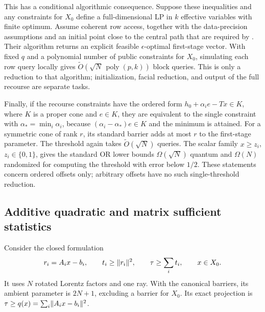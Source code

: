 This has a conditional algorithmic consequence.  Suppose these
inequalities and any constraints for $X_0$ define a full-dimensional LP
in $k$ effective variables with finite optimum.  Assume coherent row
access, together with the data-precision assumptions and an initial point
close to the central path that are required by \citet[Theorems~1.3 and~6.1]{ApersGribling2026}.
Their algorithm returns an explicit feasible $\epsilon$-optimal first-stage
vector.  With fixed $q$ and a polynomial number of public constraints for
$X_0$, simulating each row query locally gives
$\widetilde O(\sqrt N\,\operatorname{poly}(p,k))$ block queries.
This is only a reduction to that algorithm; initialization, facial
reduction, and output of the full recourse are separate tasks.

Finally, if the recourse constraints have the ordered form
$h_0+\alpha_i e-Tx\in K$, where $K$ is a proper cone and $e\in K$, they
are equivalent to the single constraint with
$\alpha_* =\min_i\alpha_i$, because
$(\alpha_i-\alpha_*)e\in K$ and the minimum is attained.
For a symmetric cone of rank $r$, its standard barrier adds at most $r$
to the first-stage parameter.  The threshold again takes
$\widetilde O(\sqrt N)$ queries.  The scalar family $x\geq z_i$,
$z_i\in\{0,1\}$, gives the standard OR lower bounds
$\Omega(\sqrt N)$ quantum and $\Omega(N)$ randomized
\citep{BBBV1997} for computing the threshold with error below $1/2$.
These statements concern ordered offsets only; arbitrary offsets have no
such single-threshold reduction.

\subsection{Additive quadratic and matrix sufficient statistics}

Consider the closed formulation
\begin{equation}\label{eq:projected-quadratic-lift}
 r_i=A_ix-b_i,\qquad t_i\geq\lVert r_i\rVert^2,\qquad
 \tau\geq\sum_i t_i,\qquad x\in X_0.
\end{equation}
It uses $N$ rotated Lorentz factors and one ray.  With the canonical
barriers, its ambient parameter is $2N+1$, excluding a barrier for $X_0$.
Its exact projection is
$\tau\geq q(x)=\sum_i\lVert A_ix-b_i\rVert^2$.

